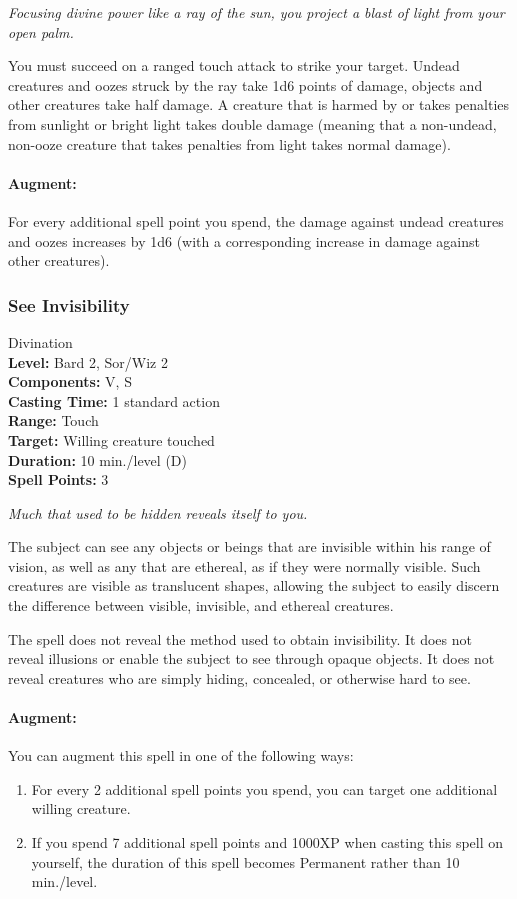 \emph{Focusing divine power like a ray of the sun, you project a blast of light from your open palm. }

You must succeed on a ranged touch attack to strike your target.
Undead creatures and oozes struck by the ray take 1d6 points of damage, objects and other creatures take half damage.
A creature that is harmed by or takes penalties from sunlight or bright light takes double damage (meaning that a non-undead, non-ooze creature that takes penalties from light takes normal damage).

\paragraph{Augment:} For every additional spell point you spend, the damage against undead creatures and oozes increases by 1d6 (with a corresponding increase in damage against other creatures).

\subsubsection{See Invisibility}
\label{Spell:SeeInvisibility}
Divination
\\ \textbf{Level:} Bard 2, Sor/Wiz 2
\\ \textbf{Components:} V, S
\\ \textbf{Casting Time:} 1 standard action
\\ \textbf{Range:} Touch
\\ \textbf{Target:} Willing creature touched
\\ \textbf{Duration:} 10 min./level (D)
\\ \textbf{Spell Points:} 3

\emph{Much that used to be hidden reveals itself to you.}

The subject can see any objects or beings that are invisible within his range of vision, as well as any that are ethereal, as if they were normally visible. 
Such creatures are visible as translucent shapes, allowing the subject to easily discern the difference between visible, invisible, and ethereal creatures.

The spell does not reveal the method used to obtain invisibility. 
It does not reveal illusions or enable the subject to see through opaque objects. 
It does not reveal creatures who are simply hiding, concealed, or otherwise hard to see.

\paragraph{Augment:} You can augment this spell in one of the following ways:
\begin{enumerate}
 \item For every 2 additional spell points you spend, you can target one additional willing creature.
 \item If you spend 7 additional spell points and 1000XP when casting this spell on yourself, the duration of this spell becomes Permanent rather than 10 min./level.
\end{enumerate}

